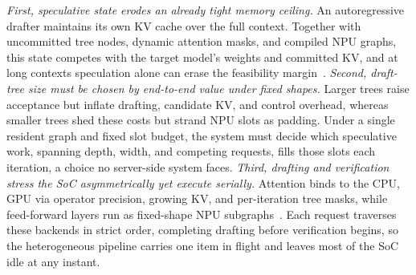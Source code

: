 \documentclass[sigconf,nonacm,10pt]{acmart}
\begin{document}
\emph{First, speculative state erodes an already tight memory ceiling.} An autoregressive drafter maintains its own KV cache over the full context. Together with uncommitted tree nodes, dynamic attention masks, and compiled NPU graphs, this state competes with the target model's weights and committed KV, and at long contexts speculation alone can erase the feasibility margin~\cite{xue2024powerinfer2,xu2025edgellm}. \emph{Second, draft-tree size must be chosen by end-to-end value under fixed shapes.} Larger trees raise acceptance but inflate drafting, candidate KV, and control overhead, whereas smaller trees shed these costs but strand NPU slots as padding. Under a single resident graph and fixed slot budget, the system must decide which speculative work, spanning depth, width, and competing requests, fills those slots each iteration, a choice no server-side system faces. \emph{Third, drafting and verification stress the SoC asymmetrically yet execute serially.} Attention binds to the CPU, GPU via operator precision, growing KV, and per-iteration tree masks, while feed-forward layers run as fixed-shape NPU subgraphs~\cite{xu2025fastondevice,chen2025heterollm}. Each request traverses these backends in strict order, completing drafting before verification begins, so the heterogeneous pipeline carries one item in flight and leaves most of the SoC idle at any instant.
\end{document}
